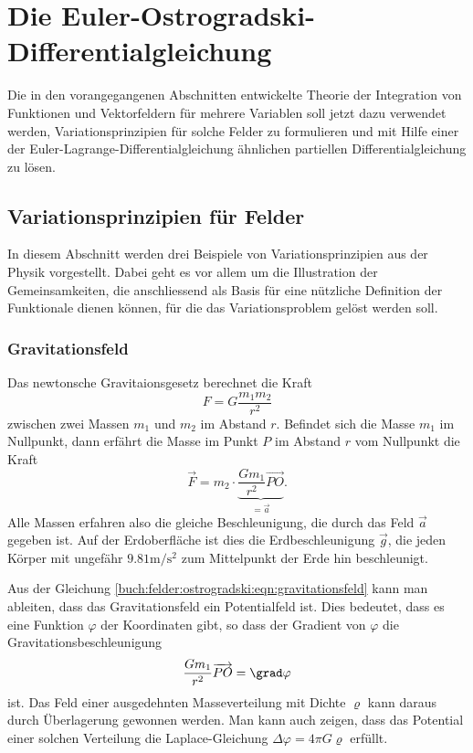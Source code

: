 %
%
%
\section{Die Euler-Ostrogradski-Differentialgleichung
\label{buch:felder:section:euler-ostrogradski}}
Die in den vorangegangenen Abschnitten entwickelte Theorie der
Integration von Funktionen und Vektorfeldern für mehrere Variablen
soll jetzt dazu verwendet werden, Variationsprinzipien für solche
Felder zu formulieren und mit Hilfe einer der
Euler-Lagrange-Differentialgleichung ähnlichen partiellen
Differentialgleichung zu lösen.

% 
%
\subsection{Variationsprinzipien für Felder
\label{buch:felder:ostrogradski:subsection:variationsprinzipien}}
In diesem Abschnitt werden drei Beispiele von Variationsprinzipien aus
der Physik vorgestellt.
Dabei geht es vor allem um die Illustration der Gemeinsamkeiten,
die anschliessend als Basis für eine nützliche Definition der
Funktionale dienen können, für die das Variationsproblem gelöst
werden soll.

%
%
\subsubsection{Gravitationsfeld}
Das newtonsche Gravitaionsgesetz berechnet die Kraft
\[
F = G \frac{m_1m_2}{r^2}
\]
zwischen zwei Massen $m_1$ und $m_2$ im Abstand $r$.
Befindet sich die Masse $m_1$ im Nullpunkt, dann erfährt die Masse im
Punkt $P$ im Abstand $r$ vom Nullpunkt die Kraft 
\begin{equation}
\vec{F}
=
m_2
\cdot
\underbrace{\frac{Gm_1}{r^2} \overrightarrow{PO}}_{\displaystyle =\vec{a}}.
\label{buch:felder:ostrogradski:eqn:gravitationsfeld}
\end{equation}
Alle Massen erfahren also die gleiche Beschleunigung, die durch das
Feld $\vec{a}$ gegeben ist.
Auf der Erdoberfläche ist dies die Erdbeschleunigung $\vec{g}$, die jeden
Körper mit ungefähr $9.81 \text{m}/\text{s}^2$ zum Mittelpunkt der
Erde hin beschleunigt.

Aus der Gleichung \eqref{buch:felder:ostrogradski:eqn:gravitationsfeld}
kann man ableiten, dass das Gravitationsfeld ein Potentialfeld ist.
Dies bedeutet, dass es eine Funktion $\varphi$ der Koordinaten gibt, 
so dass der Gradient von $\varphi$ die Gravitationsbeschleunigung
\[
\frac{Gm_1}{r^2}\overrightarrow{PO}
=
\grad\varphi
\]
ist.
Das Feld einer ausgedehnten Masseverteilung mit Dichte $\varrho$
kann daraus durch Überlagerung gewonnen werden.
Man kann auch zeigen, dass das Potential einer solchen Verteilung
die Laplace-Gleichung $\Delta \varphi = 4\pi G \varrho$ erfüllt.

